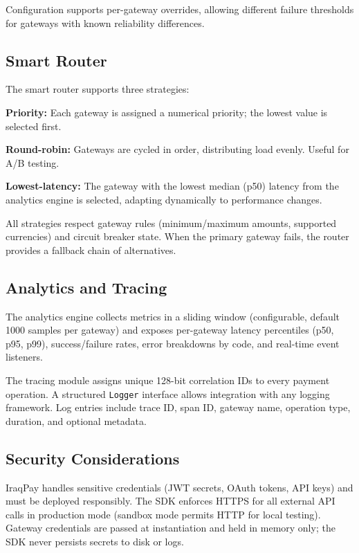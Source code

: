 \documentclass[10pt, a4paper, oneside]{article}
\begin{document}
Configuration supports per-gateway overrides, allowing different failure thresholds for gateways with known reliability differences.

\subsection{Smart Router}

The smart router supports three strategies:

\textbf{Priority:} Each gateway is assigned a numerical priority; the lowest value is selected first.

\textbf{Round-robin:} Gateways are cycled in order, distributing load evenly. Useful for A/B testing.

\textbf{Lowest-latency:} The gateway with the lowest median (p50) latency from the analytics engine is selected, adapting dynamically to performance changes.

All strategies respect gateway rules (minimum/maximum amounts, supported currencies) and circuit breaker state. When the primary gateway fails, the router provides a fallback chain of alternatives.

\subsection{Analytics and Tracing}

The analytics engine collects metrics in a sliding window (configurable, default 1000 samples per gateway) and exposes per-gateway latency percentiles (p50, p95, p99), success/failure rates, error breakdowns by code, and real-time event listeners.

The tracing module assigns unique 128-bit correlation IDs to every payment operation. A structured \texttt{Logger} interface allows integration with any logging framework. Log entries include trace ID, span ID, gateway name, operation type, duration, and optional metadata.

\subsection{Security Considerations}

IraqPay handles sensitive credentials (JWT secrets, OAuth tokens, API keys) and must be deployed responsibly. The SDK enforces HTTPS for all external API calls in production mode (sandbox mode permits HTTP for local testing). Gateway credentials are passed at instantiation and held in memory only; the SDK never persists secrets to disk or logs.
\end{document}
